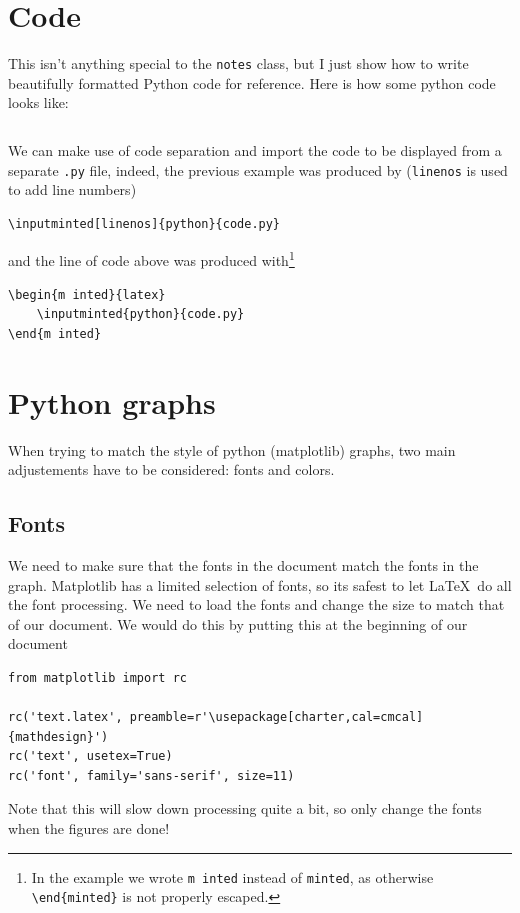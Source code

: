 \documentclass[letterpaper,11pt]{notes}
\theoremstyle{definition}
\theoremstyle{plain}
\theoremstyle{remark}
\begin{document}
\section{Code}

This isn't anything special to the \texttt{notes} class, but I just show how to write beautifully formatted Python code for reference. Here is how some python code looks like:
\inputminted[linenos]{python}{code.py}%
We can make use of code separation and import the code to be displayed from a separate \texttt{.py} file, indeed, the previous example was produced by (\texttt{linenos} is used to add line numbers)
\begin{verbatim}
\inputminted[linenos]{python}{code.py}
\end{verbatim}
and the line of code above was produced with\footnote{In the example we wrote \texttt{m inted} instead of \texttt{minted}, as otherwise \texttt{\textbackslash{}end\{minted\}} is not properly escaped.}
\begin{verbatim}
\begin{m inted}{latex}
    \inputminted{python}{code.py}
\end{m inted}
\end{verbatim}

\section{Python graphs}

When trying to match the style of python (matplotlib) graphs, two main adjustements have to be considered: fonts and colors.

\subsection{Fonts}

We need to make sure that the fonts in the document match the fonts in the graph. Matplotlib has a limited selection of fonts, so its safest to let \LaTeX\ do all the font processing. We need to load the fonts and change the size to match that of our document. We would do this by putting this at the beginning of our document
\begin{verbatim}
from matplotlib import rc

rc('text.latex', preamble=r'\usepackage[charter,cal=cmcal]{mathdesign}')
rc('text', usetex=True)
rc('font', family='sans-serif', size=11)
\end{verbatim}

Note that this will slow down processing quite a bit, so \alert{only change the fonts when the figures are done!}
\end{document}
